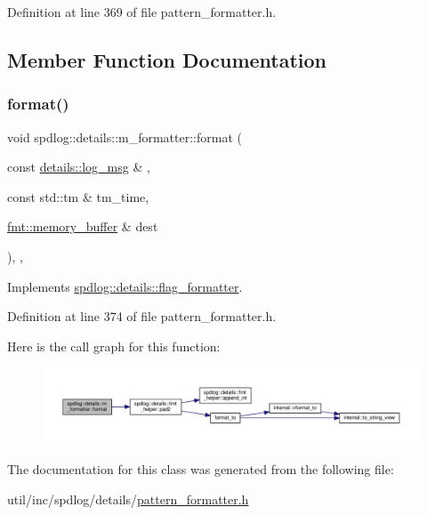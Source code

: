 Definition at line 369 of file pattern\+\_\+formatter.\+h.



\subsection{Member Function Documentation}
\mbox{\label{classspdlog_1_1details_1_1m__formatter_a507ce5bc00de736d28d93e5d7307589b}} 
\subsubsection{\texorpdfstring{format()}{format()}}
{\footnotesize\ttfamily void spdlog\+::details\+::m\+\_\+formatter\+::format (\begin{DoxyParamCaption}\item[{const \hyperlink{structspdlog_1_1details_1_1log__msg}{details\+::log\+\_\+msg} \&}]{,  }\item[{const std\+::tm \&}]{tm\+\_\+time,  }\item[{\hyperlink{format_8h_a21cbf729f69302f578e6db21c5e9e0d2}{fmt\+::memory\+\_\+buffer} \&}]{dest }\end{DoxyParamCaption})\hspace{0.3cm}{\ttfamily [inline]}, {\ttfamily [override]}, {\ttfamily [virtual]}}



Implements \hyperlink{classspdlog_1_1details_1_1flag__formatter_a33fb3e42a4c8200cceb833d92b53fb67}{spdlog\+::details\+::flag\+\_\+formatter}.



Definition at line 374 of file pattern\+\_\+formatter.\+h.

Here is the call graph for this function\+:
\nopagebreak
\begin{figure}[H]
\begin{center}
\leavevmode
\includegraphics[width=350pt]{classspdlog_1_1details_1_1m__formatter_a507ce5bc00de736d28d93e5d7307589b_cgraph}
\end{center}
\end{figure}


The documentation for this class was generated from the following file\+:\begin{DoxyCompactItemize}
\item 
util/inc/spdlog/details/\hyperlink{pattern__formatter_8h}{pattern\+\_\+formatter.\+h}\end{DoxyCompactItemize}
